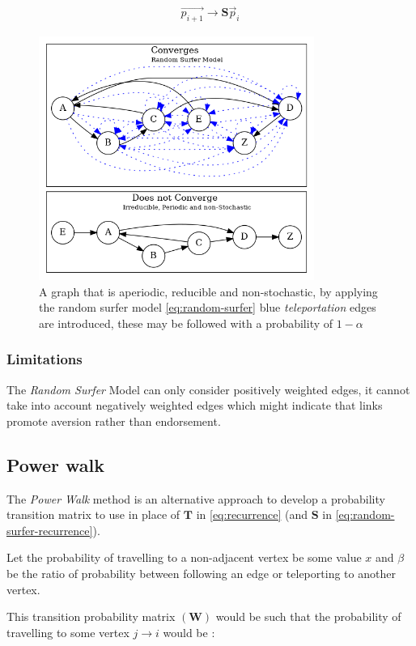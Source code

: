 \documentclass[11pt]{article}
\begin{document}
\begin{align}
\vec{p_{i+1}} \rightarrow \mathbf{S} \vec{p}_{i} \label{eq:random-surfer-recurrence}
\end{align}



\begin{figure}[htbp]
\centering
\includegraphics[width=9cm]{media/dot/random_surfer.dot.png}
\caption{\label{fig:rseg}A graph that is aperiodic, reducible and non-stochastic, by applying the random surfer model \eqref{eq:random-surfer} blue \emph{teleportation} edges are introduced, these may be followed with a probability of \(1 - \alpha\)}
\end{figure}
\subsubsection{Limitations}
\label{sec:org1ce33ff}
The \emph{Random Surfer} Model can only consider positively weighted edges, it cannot
take into account negatively weighted edges which might indicate that
links promote aversion rather than endorsement.
\subsection{Power walk}
\label{pwalk}
The \emph{Power Walk} method is an alternative approach to develop a probability
transition matrix to use in place of \(\mathbf{T}\) in \eqref{eq:recurrence} (and \(\mathbf{S}\) in \eqref{eq:random-surfer-recurrence}).

Let the probability of travelling to a non-adjacent vertex be some value \(x\)
and \(\beta\) be the ratio of probability between following an edge or
teleporting to another vertex.

This transition probability matrix \(\left( \mathbf{W}\right)\) would be such that the probability of
travelling to some vertex \(j \rightarrow i\) would be :
\end{document}
